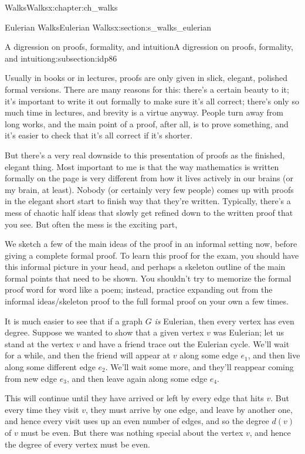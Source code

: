 \documentclass[oneside,10pt,]{book}
\numberwithin{equation}{section}
\begin{document}
\begin{chapterptx}{Walks}{}{Walks}{}{}{x:chapter:ch_walks}
\begin{sectionptx}{Eulerian Walks}{}{Eulerian Walks}{}{}{x:section:s_walks_eulerian}
\begin{subsectionptx}{A digression on proofs, formality, and intuition}{}{A digression on proofs, formality, and intuition}{}{}{g:subsection:idp86}
\par
Usually in books or in lectures, proofs are only given in slick, elegant, polished formal versions.  There are many reasons for this: there's a certain beauty to it; it's important to write it out formally to make sure it's all correct; there's only so much time in lectures, and brevity is a virtue anyway.  People turn away from long works, and the main point of a proof, after all, is to prove something, and it's easier to check that it's all correct if it's shorter.%
\par
But there's a very real downside to this presentation of proofs as the finished, elegant thing.  Most important to me is that the way mathematics is written formally on the page is very different from how it lives actively in our brains (or my brain, at least).  Nobody (or certainly very few people) comes up with proofs in the elegant short start to finish way that they're written.  Typically, there's a mess of chaotic half ideas that slowly get refined down to the written proof that you see.  But often the mess is the exciting part,%
\par
We sketch a few of the main ideas of the proof in an informal setting now, before giving a complete formal proof.  To learn this proof for the exam, you should have this informal picture in your head, and perhaps a skeleton outline of the main formal points that need to be shown.  You shouldn't try to memorize the formal proof word for word like a poem; instead, practice expanding out from the informal ideas\slash{}skeleton proof to the full formal proof on your own a few times.%
\par
It is much easier to see that if a graph \(G\) \emph{is} Eulerian, then every vertex has even degree.  Suppose we wanted to show that a given vertex \(v\) was Eulerian; let us stand at the vertex \(v\) and have a friend trace out the Eulerian cycle.  We'll wait for a while, and then the friend will appear at \(v\) along some edge \(e_1\), and then live along some different edge \(e_2\).  We'll wait some more, and they'll reappear coming from new edge \(e_3\), and then leave again along some edge \(e_4\).%
\par
This will continue until they have arrived or left by every edge that hits \(v\).  But every time they visit \(v\), they must arrive by one edge, and leave by another one, and hence every visit uses up an even number of edges, and so the degree \(d(v)\) of \(v\) must be even.  But there was nothing special about the vertex \(v\), and hence the degree of every vertex must be even.%

\end{subsectionptx}
\end{sectionptx}
\end{chapterptx}
\end{document}
